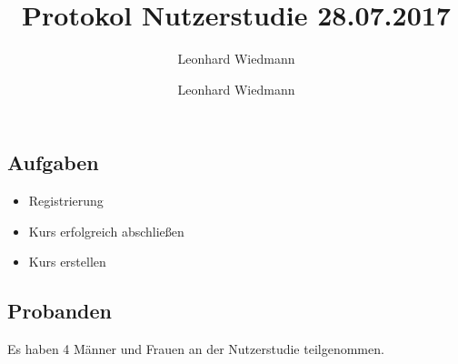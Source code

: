 \documentclass[colorback, accentcolor=tud1c, paper=a4]{tudexercise}
\title{Protokol Nutzerstudie 28.07.2017}
\subtitle{Leonhard Wiedmann}
\author{Leonhard Wiedmann}
\begin{document}
\maketitle
\subsection*{Aufgaben}
	\begin{itemize}
	\item Registrierung
  \item Kurs erfolgreich abschließen
  \item Kurs erstellen
	\end{itemize}

\subsection*{Probanden}
Es haben 4 Männer und Frauen an der Nutzerstudie teilgenommen.
\end{document}
